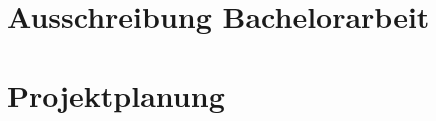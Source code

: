 

\appendix

\chapter{Ausschreibung Bachelorarbeit}\label{anhang_ausschreibung} 


\chapter{Projektplanung}\label{anhang_projektplan} 


